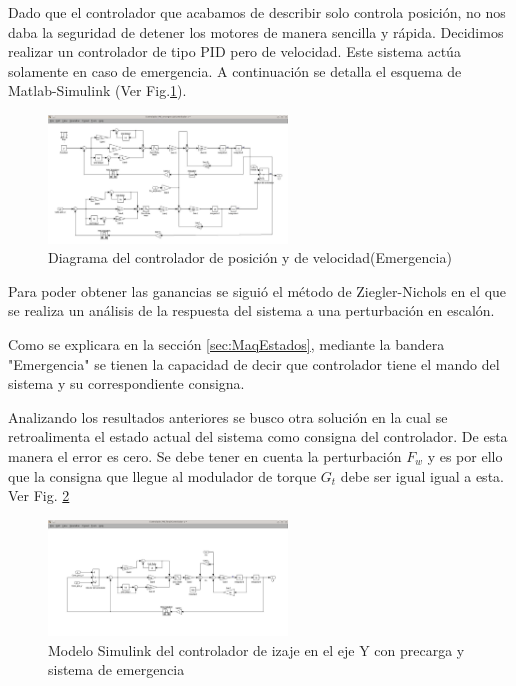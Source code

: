 \documentclass[journal]{IEEEtran}
\begin{document}
Dado que el controlador que acabamos de describir solo controla posición, 
no nos daba la seguridad de detener los motores de manera sencilla y rápida. 
Decidimos realizar un controlador de tipo PID 
pero de velocidad. Este sistema actúa solamente en caso de emergencia. A continuación se 
detalla el esquema de Matlab-Simulink (Ver Fig.\ref{fig:ControlVel}).

\begin{figure}[!t]
 \centering
  \includegraphics[width=2.5in]{Test_Controlador_emergencia1.jpeg}
  \caption{Diagrama del controlador de posición y de velocidad(Emergencia)}
  \label{fig:ControlVel}
\end{figure}

Para poder obtener las ganancias se siguió el método de Ziegler-Nichols en el que se 
realiza un análisis de la respuesta del sistema a una perturbación en escalón.

Como se explicara en la sección \ref{sec:MaqEstados}, mediante la bandera "Emergencia" 
se tienen la capacidad de decir que controlador tiene el mando del sistema y su 
correspondiente consigna.

Analizando los resultados anteriores se busco otra solución en la cual se retroalimenta 
el estado actual del sistema como consigna del controlador. De esta manera el error es 
cero. Se debe tener en cuenta la perturbación $F_w$ y es por ello que la consigna que 
llegue al modulador de torque $G_t$ debe ser igual igual a esta. Ver Fig.
\ref{fig:testVel} 

\begin{figure}[!t]
 \centering
  \includegraphics[width=2.5in]{Controlador_precarga_velocidad.jpeg}
  \caption{Modelo Simulink del controlador de izaje en el eje Y con precarga y sistema de 
  emergencia}
  \label{fig:testVel}
\end{figure}
\end{document}
